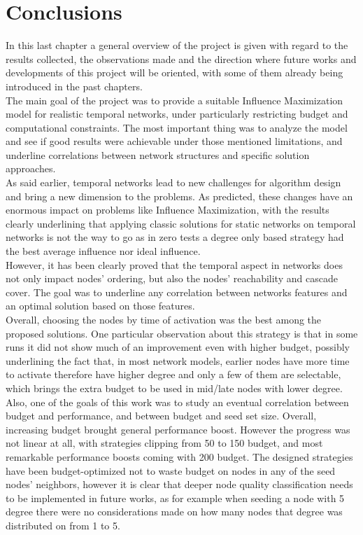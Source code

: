 \chapter{Conclusions}
\label{cha:conclusion}
In this last chapter a general overview of the project is given with regard to the results collected, the observations made and the direction where future works and developments of this project will be oriented, with some of them already being introduced in the past chapters. 
\\
The main goal of the project was to provide a suitable Influence Maximization model for realistic temporal networks, under particularly restricting budget and computational constraints. The most important thing was to analyze the model and see if good results were achievable under those mentioned limitations, and underline correlations between network structures and specific solution approaches.
\\ 
As said earlier, temporal networks lead to new challenges for algorithm design and bring a new dimension to the problems. As predicted, these changes have an enormous impact on problems like Influence Maximization, with the results clearly underlining that applying classic solutions for static networks on temporal networks is not the way to go as in zero tests a degree only based strategy had the best average influence nor ideal influence.\\
However, it has been clearly proved that the temporal aspect in networks does not only impact nodes' ordering, but also the nodes' reachability and cascade cover. The goal was to underline any correlation between networks features and an optimal solution based on those features. \\
Overall, choosing the nodes by time of activation was the best among the proposed solutions. One particular observation about this strategy is that in some runs it did not show much of an improvement even with higher budget, possibly underlining the fact that, in most network models, earlier nodes have more time to activate therefore have higher degree and only a few of them are selectable, which brings the extra budget to be used in mid/late nodes with lower degree. \\
Also, one of the goals of this work was to study an eventual correlation between budget and performance, and between budget and seed set size. Overall, increasing budget brought general performance boost. However the progress was not linear at all, with strategies clipping from 50 to 150 budget, and most remarkable performance boosts coming with 200 budget. The designed strategies have been budget-optimized not to waste budget on nodes in any of the seed nodes' neighbors, however it is clear that deeper node quality classification needs to be implemented in future works, as for example when seeding a node with 5 degree there were no considerations made on how many nodes that degree was distributed on from 1 to 5.\\
